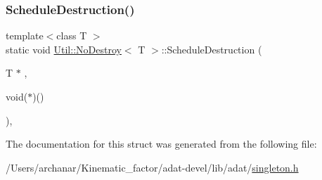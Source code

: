 \subsubsection{\texorpdfstring{ScheduleDestruction()}{ScheduleDestruction()}\hspace{0.1cm}{\footnotesize\ttfamily [3/3]}}
{\footnotesize\ttfamily template$<$class T $>$ \\
static void \mbox{\hyperlink{structUtil_1_1NoDestroy}{Util\+::\+No\+Destroy}}$<$ T $>$\+::Schedule\+Destruction (\begin{DoxyParamCaption}\item[{T $\ast$}]{,  }\item[{void($\ast$)()}]{ }\end{DoxyParamCaption})\hspace{0.3cm}{\ttfamily [inline]}, {\ttfamily [static]}}



The documentation for this struct was generated from the following file\+:\begin{DoxyCompactItemize}
\item 
/\+Users/archanar/\+Kinematic\+\_\+factor/adat-\/devel/lib/adat/\mbox{\hyperlink{adat-devel_2lib_2adat_2singleton_8h}{singleton.\+h}}\end{DoxyCompactItemize}
